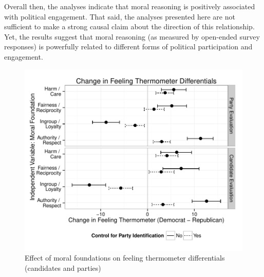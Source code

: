 \documentclass[12pt]{article}
\begin{document}
Overall then, the analyses indicate that moral reasoning is positively associated with political engagement. That said, the analyses presented here are not sufficient to make a strong causal claim about the direction of this relationship. Yet, the results suggest that moral reasoning (as measured by open-ended survey responses) is powerfully related to different forms of political participation and engagement.

\begin{figure}[h]\centering
\includegraphics[scale=.9]{../calc/fig/fig7feel.pdf}
\caption{Effect of moral foundations on feeling thermometer differentials (candidates and parties)}\label{fig:7feel}
\end{figure}
\end{document}
